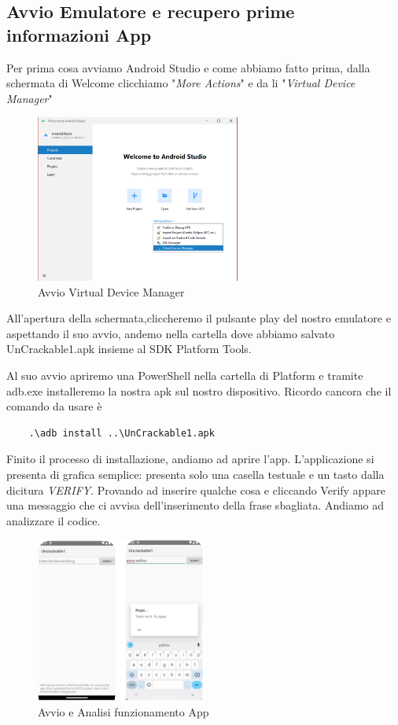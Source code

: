 \documentclass{article}
\begin{document}
\subsection{Avvio Emulatore e recupero prime informazioni App}
Per prima cosa avviamo Android Studio e come abbiamo fatto prima, dalla schermata di Welcome clicchiamo "\textit{More Actions}" e da li 
"\textit{Virtual Device Manager}" 
\begin{figure}[htbp]
    \centering
    \includegraphics[width=0.6\textwidth]{./insecureshop/andStudDevice.png}
    \captionsetup{labelformat=empty}
    \caption{Avvio Virtual Device Manager}
    \label{fig:VDMStart2}
\end{figure}

All'apertura della schermata,cliccheremo il pulsante play del nostro emulatore e aspettando il suo avvio, andemo nella cartella 
dove abbiamo salvato UnCrackable1.apk insieme al SDK Platform Tools. 

Al suo avvio apriremo una PowerShell nella cartella di Platform e tramite adb.exe installeremo la nostra apk sul nostro dispositivo.
Ricordo cancora che il comando da usare è
\begin{verbatim}
    .\adb install ..\UnCrackable1.apk
\end{verbatim}

Finito il processo di installazione, andiamo ad aprire l'app. L'applicazione si presenta di grafica semplice: presenta solo 
una casella testuale e un tasto dalla dicitura \textit{VERIFY}. Provando ad inserire qualche cosa e cliccando Verify appare una 
messaggio che ci avvisa dell'inserimento della frase sbagliata.
Andiamo ad analizzare il codice.
\begin{figure}[htbp]
    \centering
    \includegraphics[width=0.5\textwidth]{./uncrackable1/avvioApp+Test.png}
    \captionsetup{labelformat=empty}
    \caption{Avvio e Analisi funzionamento App}
    \label{fig:AvvioTestApp}
\end{figure}
\newpage
\end{document}
